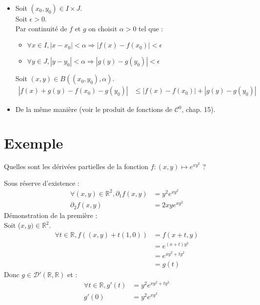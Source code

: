 \documentclass[../main.tex]{subfiles}
\begin{document}
\begin{itemize}
    \item Soit $(x_0, y_0)\in I\times J$. \\
    Soit $\epsilon > 0$. \\
    Par continuité de $f$ et $g$ on choisit $\alpha > 0$ tel que : 
    \begin{itemize}
        \item $\forall x\in I, |x - x_0| < \alpha \Rightarrow |f(x) - f(x_0)| < \epsilon$
        \item $\forall y\in J, |y - y_0| < \alpha \Rightarrow |g(y) - g(y_0)| < \epsilon$
    \end{itemize}
    Soit $(x, y)\in B((x_0, y_0), \alpha)$. 
    \begin{align*}
        |f(x) + g(y) - f(x_0) - g(y_0)| &\leq |f(x) - f(x_0)| + |g(y) - g(y_0)|
    \end{align*}
    \item De la même manière (voir le produit de fonctions de $\mathcal{C}^0$, chap. 15). 
\end{itemize}

\section{Exemple}
\begin{tcolorbox}[title=Exemple 36.24, title filled=false, colframe=darkgreen, colback=darkgreen!10!white]
    Quelles sont les dérivées partielles de la fonction $f:(x, y)\mapsto e^{xy^2}$ ?
\end{tcolorbox}

\noindent Sous réserve d'existence : 
\begin{align*}
    \forall (x, y)\in \mathbb{R}^2, \partial_1f(x, y) &= y^2 e^{xy^2} \\
    \partial_2f(x, y) &= 2xy e^{xy^2}
\end{align*}
Démonstration de la première : \\
Soit ($x, y)\in \mathbb{R}^2$. 
\begin{align*}
    \forall t\in \mathbb{R}, f((x, y) + t(1, 0)) &= f(x + t, y) \\
    &= e^{(x + t)y^2} \\
    &= e^{xy^2 + ty^2} \\
    &= g(t)
\end{align*}
Donc $g\in \mathcal{D}'(\mathbb{R}, \mathbb{R})$ et : 
\begin{align*}
    \forall t\in \mathbb{R}, g'(t) &= y^2 e^{xy^2 + ty^2} \\
    g'(0) &= y^2 e^{xy^2}
\end{align*}
\end{document}
